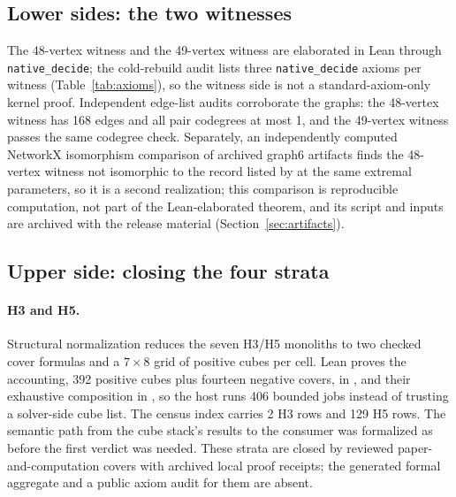 \documentclass{anvil-paper}
\theoremstyle{definition}
\begin{document}
\subsection{Lower sides: the two witnesses}\label{sec:lower}

The 48-vertex witness  and the 49-vertex witness  are elaborated in Lean through \texttt{native\_decide}; the cold-rebuild audit lists three \texttt{native\_decide} axioms per witness (Table~\ref{tab:axioms}), so the witness side is not a standard-axiom-only kernel proof. Independent edge-list audits corroborate the graphs: the 48-vertex witness has 168 edges and all pair codegrees at most 1, and the 49-vertex witness passes the same codegree check. Separately, an independently computed NetworkX isomorphism comparison of archived graph6 artifacts finds the 48-vertex witness not isomorphic to the record listed by \citet{afzaly-mckay-extremal} at the same extremal parameters, so it is a second realization; this comparison is reproducible computation, not part of the Lean-elaborated theorem, and its script and inputs are archived with the release material (Section~\ref{sec:artifacts}).

\subsection{Upper side: closing the four strata}\label{sec:upper}

\paragraph{H3 and H5.} Structural normalization reduces the seven H3/H5 monoliths to two checked cover formulas and a $7\times 8$ grid of positive cubes per cell. Lean proves the accounting, 392 positive cubes plus fourteen negative covers, in , and their exhaustive composition in , so the host runs 406 bounded jobs instead of trusting a solver-side cube list. The census index carries 2 H3 rows and 129 H5 rows. The semantic path from the cube stack's  results to the consumer was formalized as  before the first verdict was needed. These strata are closed by reviewed paper-and-computation covers with archived local proof receipts; the generated formal aggregate and a public axiom audit for them are absent.
\end{document}
